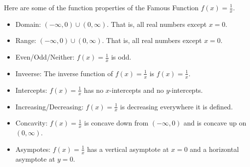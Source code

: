 \documentclass{ximera}
\begin{document}
%
%
%
%
%



\begin{summary}
Here are some of the function properties of the Famous Function $f(x)=\frac{1}{x}$.
\begin{itemize}
\item Domain: $(-\infty,0) \cup (0,\infty)$.  That is, all real numbers except $x=0$.
\item Range:  $(-\infty,0) \cup (0,\infty)$.  That is, all real numbers except $x=0$.
\item Even/Odd/Neither:  $f(x)=\frac{1}{x}$ is odd.
\item Inveerse:  The inverse function of $f(x)=\frac{1}{x}$ is $f(x)=\frac{1}{x}$.
\item Intercepts: $f(x)=\frac{1}{x}$ has no $x$-intercepts and no $y$-intercepts.
\item Increasing/Decreasing:  $f(x)=\frac{1}{x}$ is decreasing everywhere it is defined.
\item Concavity: $f(x)=\frac{1}{x}$ is concave down from $(-\infty,0)$ and is concave up on $(0,\infty)$.
\item Asympotes: $f(x)=\frac{1}{x}$ has a vertical asymptote at $x=0$ and a horizontal asymptote at $y=0$.
\end{itemize}\end{summary}
\end{document}
